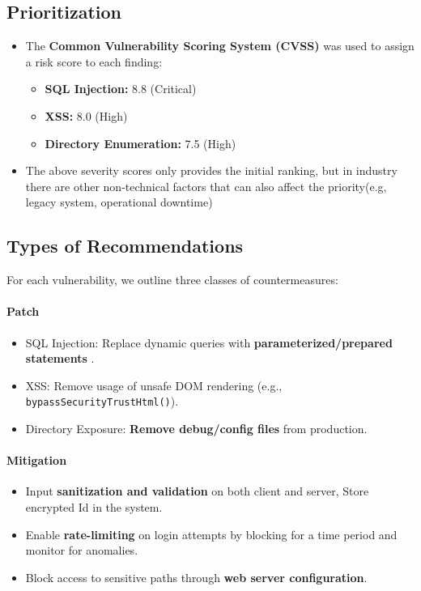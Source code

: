 \documentclass[12pt]{article}
\begin{document}
\subsection{Prioritization}
\begin{itemize}
    \item The \textbf{Common Vulnerability Scoring System (CVSS)} was used to assign a risk score to each finding:
    \begin{itemize}
        \item \textbf{SQL Injection:} 8.8 (Critical)
        \item \textbf{XSS:} 8.0 (High)
        \item \textbf{Directory Enumeration:} 7.5 (High)
    \end{itemize}
    \item The above severity scores only provides the initial ranking, but in industry there are other non-technical factors that can also affect the priority(e.g, legacy system, operational downtime)
\end{itemize}

\subsection{Types of Recommendations}
For each vulnerability, we outline three classes of countermeasures:

\paragraph{Patch}
\begin{itemize}
    \item SQL Injection: Replace dynamic queries with \textbf{parameterized/prepared statements} \cite{owasp-sql-injection}.
    \item XSS: Remove usage of unsafe DOM rendering (e.g., \texttt{bypassSecurityTrustHtml()}).
    \item Directory Exposure: \textbf{Remove debug/config files} from production.
\end{itemize}

\paragraph{Mitigation}
\begin{itemize}
    \item Input \textbf{sanitization and validation} on both client and server, Store encrypted Id in the system.
    \item Enable \textbf{rate-limiting} on login attempts by blocking for a time period and monitor for anomalies.
    \item Block access to sensitive paths through \textbf{web server configuration}.
\end{itemize}
\end{document}
